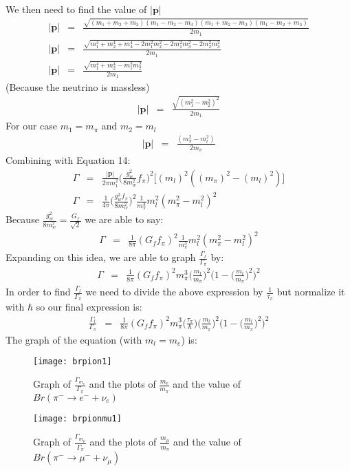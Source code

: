 \documentclass[12pt]{article}
\def \bea{\begin{eqnarray}}
\def \eea{\end{eqnarray}}
\def \nn{\nonumber}
\def \nl{\nn \\}
\def \Ga{\Gamma}
\begin{document}
We then need to find the value of $|\textbf{p}|$\\
\bea
|\textbf{p}| &=& \frac{\sqrt{(m_1+m_2+m_3)(m_1-m_2-m_3)(m_1+m_2-m_3)(m_1-m_2+m_3)}}{2m_1}\\
|\textbf{p}| &=& \frac{\sqrt{m_1^4+m_2^4 + m_3^4 -2m_1^2m_2^2 - 2m_1^2m_3^2 - 2m_2^2m_3^2}}{2m_1}\nl
|\textbf{p}| &=& \frac{\sqrt{m_1^4+m_2^4-m_1^2m_2^2}}{2m_1}
\eea
(Because the neutrino is massless)
\bea
|\textbf{p}| &=& \frac{\sqrt{(m_1^2-m_2^2)^2}}{2m_1}
\eea 
For our case $m_1=m_\pi$ and $m_2=m_l$
\bea
|\textbf{p}| &=& \frac{(m_\pi^2-m_l^2)}{2m_\pi}
\eea
Combining with Equation 14: 
\bea 
\Ga &=& \frac{|\textbf{p}|}{2\pi m_1^2}\bigg(\frac{g_w^2}{8m_w^2}f_\pi\bigg)^2\bigg[(m_l)^2((m_\pi)^2 -(m_l)^2)\bigg]\\
\Ga &=& \frac{1}{4\pi}\bigg(\frac{g_w^2f_\pi}{8m_w^2}\bigg)^2\frac{1}{m_\pi^3}m_l^2(m_\pi^2-m_l^2)^2
\eea
Because $\frac{g_w^2}{8m_w^2}= \frac{G_f}{\sqrt{2}}$ we are able to say:
\bea
\Ga &=& \frac{1}{8\pi}(G_f f_\pi)^2\frac{1}{m_\pi^3}m_l^2(m_\pi^2-m_l^2)^2
\eea 
Expanding on this idea, we are able to graph $\frac{\Ga_l}{\Ga_\pi}$ by: 
\bea
\Ga &=& \frac{1}{8\pi}(G_f f_\pi)^2m_\pi^3\bigg(\frac{m_l}{m_\pi}\bigg)^2\bigg(1-\bigg(\frac{m_l}{m_\pi}\bigg)^2\bigg)^2
\eea
In order to find $\frac{\Ga_{l}}{\Ga_\pi}$ we need to divide the above expression by $\frac{1}{\tau_\pi}$ but normalize it with $\hbar$ so our final expression is: 
\bea
\frac{\Ga_l}{\Ga_\pi}&=& \frac{1}{8\pi}(G_f f_\pi)^2m_\pi^3\bigg(\frac{\tau_\pi}{\hbar}\bigg)\bigg(\frac{m_l}{m_\pi}\bigg)^2\bigg(1-\bigg(\frac{m_l}{m_\pi}\bigg)^2\bigg)^2
\eea 
\newpage
The graph of the equation (with $m_l = m_e$) is:
\\
\begin{figure}[h]
\centering
\texttt{[image: brpion1]}
\caption{Graph of $\frac{\Ga_{m_e}}{\Ga_\pi}$ and the plots of $\frac{m_e}{m_\pi}$ and the value of $Br(\pi^{-} \rightarrow e^{-} + \nu_e)$}
\end{figure}
\begin{figure}[h]
\centering
\texttt{[image: brpionmu1]}
\caption{Graph of $\frac{\Ga_{m_\mu}}{\Ga_\pi}$ and the plots of $\frac{m_\mu}{m_\pi}$ and the value of $Br(\pi^{-} \rightarrow \mu^{-} + \nu_\mu)$}
\end{figure}
\\
\\
\\
\\
\\
\\
\\
\end{document}

